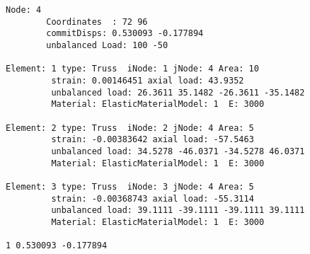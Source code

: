 \documentclass[12pt]{article}
\begin{document}
{\sf\small
\begin{verbatim}
Node: 4
        Coordinates  : 72 96 
        commitDisps: 0.530093 -0.177894 
        unbalanced Load: 100 -50 

Element: 1 type: Truss  iNode: 1 jNode: 4 Area: 10 
         strain: 0.00146451 axial load: 43.9352 
         unbalanced load: 26.3611 35.1482 -26.3611 -35.1482 
         Material: ElasticMaterialModel: 1  E: 3000

Element: 2 type: Truss  iNode: 2 jNode: 4 Area: 5 
         strain: -0.00383642 axial load: -57.5463 
         unbalanced load: 34.5278 -46.0371 -34.5278 46.0371 
         Material: ElasticMaterialModel: 1  E: 3000

Element: 3 type: Truss  iNode: 3 jNode: 4 Area: 5 
         strain: -0.00368743 axial load: -55.3114 
         unbalanced load: 39.1111 -39.1111 -39.1111 39.1111 
         Material: ElasticMaterialModel: 1  E: 3000

1 0.530093 -0.177894
\end{verbatim}
}
\end{document}
